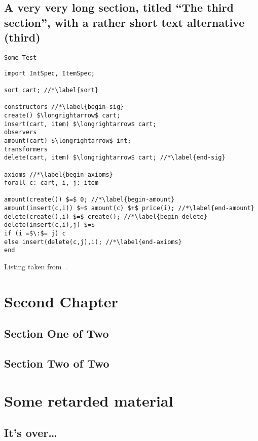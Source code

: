 \documentclass[]{usiinfdocprop}
\begin{document}
\section[third]{A very very long section, titled ``The third section'', with
  a rather  short text alternative (third)}
\lipsum[8-11]
 \texttt{Some Test}
\begin{lstlisting}
import IntSpec, ItemSpec;

sort cart; //*\label{sort}

constructors //*\label{begin-sig}
create() $\longrightarrow$ cart;
insert(cart, item) $\longrightarrow$ cart;
observers
amount(cart) $\longrightarrow$ int;
transformers
delete(cart, item) $\longrightarrow$ cart; //*\label{end-sig}

axioms //*\label{begin-axioms}
forall c: cart, i, j: item 

amount(create()) $=$ 0; //*\label{begin-amount}
amount(insert(c,i)) $=$ amount(c) $+$ price(i); //*\label{end-amount}
delete(create(),i) $=$ create(); //*\label{begin-delete}
delete(insert(c,i),j) $=$
if (i =$\:$= j) c
else insert(delete(c,j),i); //*\label{end-axioms}
end
\end{lstlisting}

Listing taken from~\cite{bg:soswe07}.

\chapter{Second Chapter}
\section{Section One of Two}
\lipsum[8-15]
\section{Section Two of Two}
\lipsum[15-22]

\nocite{*}

\appendix %

\chapter{Some retarded material}
\section{It's over\dots}
\lipsum[22-29]


\backmatter


\end{document}
